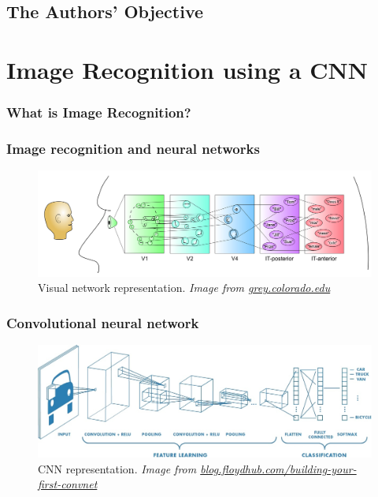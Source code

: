 \documentclass[xcolor=dvipsnames]{beamer}
\begin{document}
		\subsection{The Authors' Objective}
		
			\begin{frame}
				\frametitle{}
				
			\end{frame}
	
	\section{Image Recognition using a CNN}
		
		\begin{frame}
			\frametitle{What is Image Recognition?}
			
		\end{frame}
	
		\begin{frame}
			\frametitle{Image recognition and neural networks}
			\begin{figure}
				\includegraphics[width=\textwidth]{images/fig_category_hierarch_dist_reps.png}
				\caption{Visual network representation. \textit{Image from \href{https://grey.colorado.edu/CompCogNeuro/index.php/CCNBook/Networks}{grey.colorado.edu}} \cite{ccn_path}}
			\end{figure}
		\end{frame}

		\begin{frame}
			\frametitle{Convolutional neural network}
			\begin{figure}
				\includegraphics[width=\textwidth]{images/cnn2.jpg}
				\centering
				\caption{CNN representation. \textit{Image from \href{https://blog.floydhub.com/building-your-first-convnet/}{blog.floydhub.com/building-your-first-convnet}} \cite{first_cnn}}
			\end{figure}
		\end{frame}
		
\end{document}

